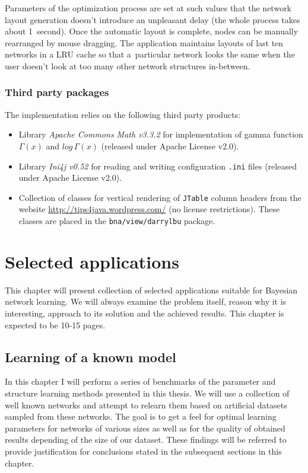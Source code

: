 \documentclass[english,cover]{fitthesis} %
\newcommand{\term}[1]{\emph{#1}}           %
\newcommand{\srccode}[1]{{\tt #1}}         %
\newcommand{\todo}[1]{{\color{red}#1}}
\begin{document}
Parameters of the optimization process are set at such values that the network layout generation doesn't introduce an unpleasant delay (the whole process takes about 1~second). Once the automatic layout is complete, nodes can be manually rearranged by mouse dragging. The application maintains layouts of last ten networks in a LRU cache so that a~particular network looks the same when the user doesn't look at too many other network structures in-between.




\subsection{Third party packages}
The implementation relies on the following third party products:
\begin{itemize}
    \item Library \term{Apache Commons Math v3.3.2} for implementation of gamma function $\Gamma(x)$ and $log \, \Gamma(x)$ (released under Apache License v2.0).
	\item Library \term{Ini4j v0.52} for reading and writing configuration \srccode{.ini} files (released under Apache License v2.0).
	\item Collection of classes for vertical rendering of \srccode{JTable} column headers from the website \url{http://tips4java.wordpress.com/} (no license restrictions). These classes are placed in the \srccode{bna/view/darrylbu} package.
\end{itemize}





















\chapter{Selected applications}\label{ch:practical}
This chapter will present collection of selected applications suitable for Bayesian network learning. We will always examine the problem itself, reason why it is interesting, approach to its solution and the achieved results. \todo{This chapter is expected to be 10-15 pages.}

\section{Learning of a known model}
In this chapter I will perform a series of benchmarks of the parameter and structure learning methods presented in this thesis. We will use a collection of well known networks and attempt to relearn them based on artificial datasets sampled from these networks. The goal is to get a feel for optimal learning parameters for networks of various sizes as well as for the quality of obtained results depending of the size of our dataset. These findings will be referred to provide justification for conclusions stated in the subsequent sections in this chapter.
\end{document}
